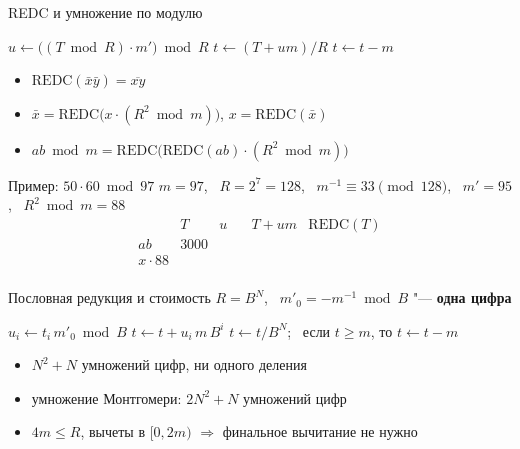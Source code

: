\documentclass{ca-slides}
\begin{document}
\begin{canvasframe}{REDC и умножение по модулю}
  \small
  \begin{algorithmic}[1]
    \State $u \gets \bigl((T \bmod R) \cdot m'\bigr) \bmod R$ 
    \State $t \gets (T + um) / R$ 
     \State $t \gets t - m$ \EndIf
  \end{algorithmic}
  \medskip
  \begin{itemize}
    \item $\mathrm{REDC}(\bar x \bar y) = \overline{xy}$
    \item $\bar x = \mathrm{REDC}\bigl(x \cdot (R^2 \bmod m)\bigr)$, \quad
      $x = \mathrm{REDC}(\bar x)$
    \item $ab \bmod m = \mathrm{REDC}\bigl(\mathrm{REDC}(ab) \cdot (R^2 \bmod m)\bigr)$
  \end{itemize}
\end{canvasframe}

\begin{canvasframe}{Пример: $50 \cdot 60 \bmod 97$}
  $m = 97$, \ $R = 2^7 = 128$, \ $m^{-1} \equiv 33 \pmod{128}$, \ $m' = 95$, \
  $R^2 \bmod m = 88$
  \medskip
  \[
  \begin{array}{l|r|r|r|r}
    & T & u & T + um & \mathrm{REDC}(T) \\ \hline
    ab & 3000 & \phantom{000} & \phantom{00000} & \phantom{000} \\[4pt]
    x \cdot 88 & & & & \\[4pt]
  \end{array}
  \]
  \notearea[0.2\textheight]
\end{canvasframe}

\begin{canvasframe}{Пословная редукция и стоимость}
  \small
  $R = B^N$, \ $m'_0 = -m^{-1} \bmod B$ "--- \textbf{одна цифра}
  \begin{algorithmic}[1]
      \State $u_i \gets t_i\, m'_0 \bmod B$
      \State $t \gets t + u_i\, m\, B^i$ 
    \EndFor
    \State $t \gets t / B^N$; \ если $t \ge m$, то $t \gets t - m$
  \end{algorithmic}
  \begin{itemize}
    \item $N^2 + N$ умножений цифр, ни одного деления
    \item умножение Монтгомери: $2N^2 + N$ умножений цифр
    \item $4m \le R$, вычеты в $[0, 2m)$ $\Rightarrow$ финальное вычитание не нужно
  \end{itemize}
\end{canvasframe}
\end{document}
